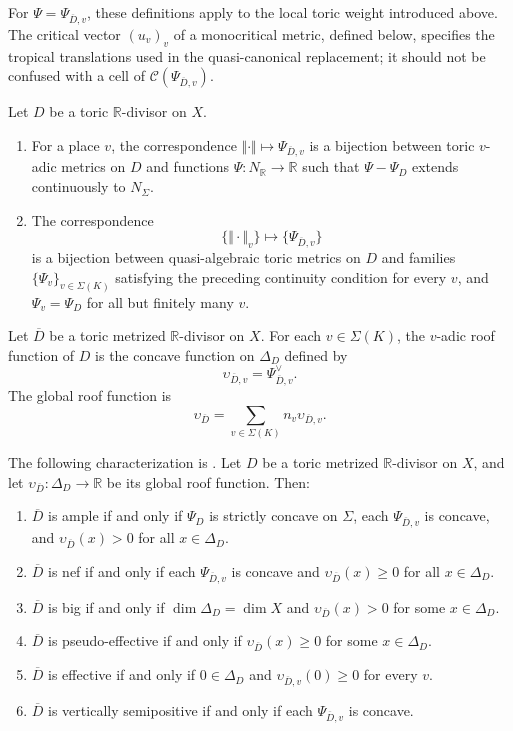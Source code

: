 \documentclass[10pt,a4paper]{amsart}
\theoremstyle{plain}
\theoremstyle{plain}
\numberwithin{equation}{section}
\begin{document}
For \(\Psi=\Psi_{\overline D,v}\), these definitions apply to the local toric
weight introduced above.  The critical vector \((u_v)_v\) of a monocritical
metric, defined below, specifies the tropical translations used in the
quasi-canonical replacement; it should not be confused with a cell of
\(\mathcal C(\Psi_{\overline D,v})\).
\begin{prop}
	Let \(D\) be a toric \(\mathbb R\)-divisor on \(X\).
	\begin{enumerate}[label=\textup{(\arabic*)},leftmargin=2em]
		\item For a place \(v\), the correspondence
		\(\Vert\cdot\Vert\mapsto\Psi_{\overline D,v}\) is a bijection between toric
		\(v\)-adic metrics on \(D\) and functions
		\(\Psi:N_{\mathbb R}\to\mathbb R\) such that \(\Psi-\Psi_D\) extends
		continuously to \(N_\Sigma\).
		\item The correspondence
		\[
		\{\Vert\cdot\Vert_v\}\longmapsto \{\Psi_{\overline D,v}\}
		\]
		is a bijection between quasi-algebraic toric metrics on \(D\) and families
		\(\{\Psi_v\}_{v\in\Sigma(K)}\) satisfying the preceding continuity condition
		for every \(v\), and \(\Psi_v=\Psi_D\) for all but finitely many \(v\).
	\end{enumerate}
\end{prop}
\begin{defn}
	Let \(\overline D\) be a toric metrized \(\mathbb R\)-divisor on \(X\).  For
	each \(v\in\Sigma(K)\), the \(v\)-adic roof function of \(D\) is the concave
	function on \(\Delta_D\) defined by
	\[
	\upsilon_{\overline D,v}=\Psi_{\overline D,v}^{\vee}.
	\]
	The global roof function is
	\[
	\upsilon_{\overline D}
	=
	\sum_{v\in\Sigma(K)} n_v\upsilon_{\overline D,v}.
	\]
\end{defn}
\begin{prop}
	The following characterization is \cite[Theorem~6.1]{BMPS22}.  Let \(D\) be a
	toric metrized \(\mathbb R\)-divisor on \(X\), and let
	\(\upsilon_{\overline D}:\Delta_D\to\mathbb R\) be its global roof function.
	Then:
	\begin{enumerate}[label=\textup{(\arabic*)},leftmargin=2em]
		\item \(\overline D\) is ample if and only if \(\Psi_D\) is strictly concave
		on \(\Sigma\), each \(\Psi_{\overline D,v}\) is concave, and
		\(\upsilon_{\overline D}(x)>0\) for all \(x\in\Delta_D\).
		\item \(\overline D\) is nef if and only if each \(\Psi_{\overline D,v}\) is
		concave and \(\upsilon_{\overline D}(x)\geq0\) for all \(x\in\Delta_D\).
		\item \(\overline D\) is big if and only if \(\dim\Delta_D=\dim X\) and
		\(\upsilon_{\overline D}(x)>0\) for some \(x\in\Delta_D\).
		\item \(\overline D\) is pseudo-effective if and only if
		\(\upsilon_{\overline D}(x)\geq0\) for some \(x\in\Delta_D\).
		\item \(\overline D\) is effective if and only if \(0\in\Delta_D\) and
		\(\upsilon_{\overline D,v}(0)\geq0\) for every \(v\).
		\item \(\overline D\) is vertically semipositive if and only if each
		\(\Psi_{\overline D,v}\) is concave.
	\end{enumerate}
\end{prop}
\end{document}
